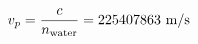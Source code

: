 \documentclass[preview]{standalone}
\begin{document}
\begin{align*}
\special{dvisvgm:raw <g id='unique000'>}v_p = \frac{c}{n_{\text{water}}} = 225407863 \text{ m/s}\special{dvisvgm:raw </g>}
\end{align*}
\end{document}
